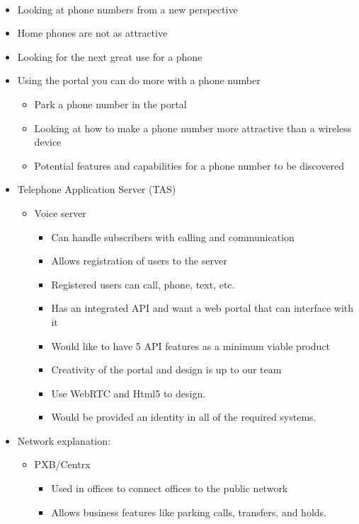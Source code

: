\documentclass[12pt]{article}
\begin{document}
\paragraph{} 
\begin{itemize}
	\item Looking at phone numbers from a new perspective
	\item Home phones are not as attractive
	\item Looking for the next great use for a phone
	\item Using the portal you can do more with a phone number
	\begin{itemize}
		\item Park a phone number in the portal
		\item Looking at how to make a phone number more attractive than a wireless device
		\item Potential features and capabilities for a phone number to be discovered
	\end{itemize}
	\item Telephone Application Server (TAS)
	\begin{itemize}
		\item Voice server
		\begin{itemize}
			\item Can handle subscribers with calling and communication
			\item Allows registration of users to the server
			\item Registered users can call, phone, text, etc.
			\item Has an integrated API and want a web portal that can interface with it
			\item Would like to have 5 API features as a minimum viable product
			\item Creativity of the portal and design is up to our team
			\item Use WebRTC and Html5 to design.
			\item Would be provided an identity in all of the required systems.
		\end{itemize}
	\end{itemize}
	\item Network explanation:
	\begin{itemize}
		\item PXB/Centrx
		\begin{itemize}
			\item  Used in offices to connect offices to the public network
			\item Allows business features like parking calls, transfers, and holds.

\end{itemize}
\end{itemize}
\end{itemize}
\end{document}
